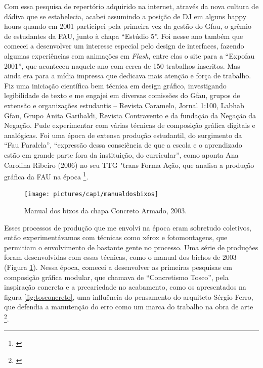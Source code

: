 Com essa pesquisa de repertório adquirido na internet, através da nova cultura de dádiva que se estabelecia, acabei assumindo a posição de DJ em alguns happy hours quando em 2001 participei pela primeira vez da gestão do Gfau, o grêmio de estudantes da FAU, junto à chapa ``Estúdio 5''. Foi nesse ano também que comecei a desenvolver um interesse especial pelo design de interfaces, fazendo algumas experiências com animações em \emph{Flash}, entre elas o site para a ``Expofau 2001'', que aconteceu naquele ano com cerca de 150 trabalhos inscritos. Mas ainda era para a mídia impressa que dedicava mais atenção e força de trabalho. Fiz uma iniciação científica bem técnica em design gráfico, investigando legibilidade de texto e me engajei em diversas comissões do Gfau, grupos de extensão e organizações estudantis – Revista Caramelo, Jornal 1:100, Labhab Gfau, Grupo Anita Garibaldi, Revista Contravento e da fundação da Negação da Negação. Pude experimentar com várias técnicas de composição gráfica digitais e analógicas. Foi uma época de extensa produção estudantil, do surgimento da ``Fau Paralela'', ``expressão dessa consciência de que a escola e o aprendizado estão em grande parte fora da instituição, do curricular'', como aponta Ana Carolina Ribeiro (2006) no seu TTG "trans Forma Ação, que analisa a produção gráfica da FAU na época \footnote{\cite{Ribeiro2006}}. 

\begin{figure}

\texttt{[image: pictures/cap1/manualdosbixos]}
\caption{Manual dos bixos da chapa Concreto Armado, 2003.}
\label{fig:bichos}
\end{figure}

Esses processos de produção que me envolvi na época eram sobretudo coletivos, então experimentávamos com técnicas como xérox e fotomontagens, que permitiam o envolvimento de bastante gente no processo. Uma série de produções foram desenvolvidas com essas técnicas, como o manual dos bichos de 2003 (Figura \ref{fig:bichos}). Nessa época, comecei a desenvolver as primeiras pesquisas em composição gráfica modular, que chamava de ``Concretismo Tosco'', pela inspiração concreta e a precariedade no acabamento, como os apresentados na figura \ref{fig:tosconcreto}, uma influência do pensamento do arquiteto Sérgio Ferro, que defendia a manutenção do erro como um marca do trabalho na obra de arte \footnote{\cite{FerroSergio2002}}. 


